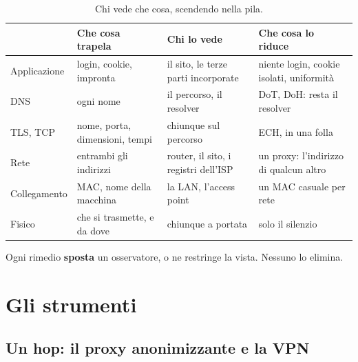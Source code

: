 \begin{table}[H]
\centering
\small
\begin{tabular}{p{2cm}p{3.3cm}p{3.6cm}p{4.2cm}}
\toprule
 & \textbf{Che cosa trapela} & \textbf{Chi lo vede} & \textbf{Che cosa lo riduce} \\
\midrule
Applicazione & login, cookie, impronta & il sito, le terze parti incorporate & niente login, cookie isolati, uniformità \\
DNS & ogni nome & il percorso, il resolver & DoT, DoH: resta il resolver \\
TLS, TCP & nome, porta, dimensioni, tempi & chiunque sul percorso & ECH, in una folla \\
Rete & entrambi gli indirizzi & router, il sito, i registri dell'ISP & un proxy: l'indirizzo di qualcun altro \\
Collegamento & MAC, nome della macchina & la LAN, l'access point & un MAC casuale per rete \\
Fisico & che si trasmette, e da dove & chiunque a portata & solo il silenzio \\
\bottomrule
\end{tabular}
\caption{Chi vede che cosa, scendendo nella pila.}
\end{table}

Ogni rimedio \textbf{sposta} un osservatore, o ne restringe la vista. Nessuno lo elimina.

\section{Gli strumenti}

\subsection{Un hop: il proxy anonimizzante e la VPN}

